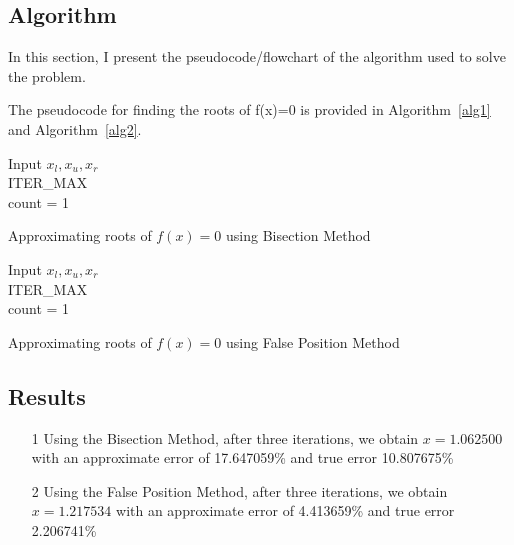 \documentclass[titlepage, 11pt]{article}
\begin{document}
\subsection{Algorithm}
In this section, I present the pseudocode/flowchart of the algorithm used to solve the problem.

The pseudocode for finding the roots of f(x)=0 is provided in Algorithm~\ref{alg1} and Algorithm~\ref{alg2}.
\begin{center}
\begin{algorithm}[H]\label{alg1}

\SetAlgoLined

Input $x_l,x_u,x_r$ \\
ITER_{MAX}  \\
count = 1 \\
 \caption{Approximating roots of $f(x)=0$ using Bisection Method}
\end{algorithm} 
\begin{algorithm}[H]\label{alg2}

\SetAlgoLined

Input $x_l,x_u,x_r$ \\
ITER_{MAX}  \\
count = 1 \\
 \caption{Approximating roots of $f(x)=0$ using False Position Method}
\end{algorithm}    
\end{center}

\subsection{Results}
\begin{itemize}
\item [1] Using the Bisection Method, after three iterations, we obtain $x=1.062500$ with an approximate error of 17.647059\% and true error 10.807675\% \\
\item [2] Using the False Position Method, after three iterations, we obtain $x=1.217534$ with an approximate error of 4.413659\% and true error 2.206741\%\\
\end{itemize}
\end{document}
